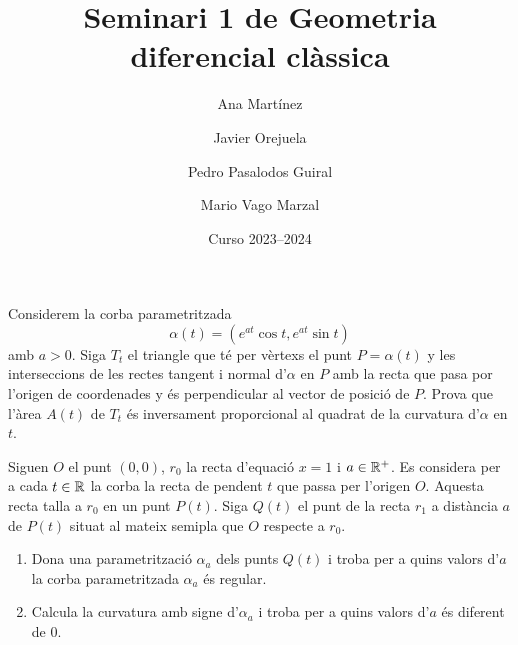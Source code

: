 \documentclass[a4paper, 11pt]{article}
\title{Seminari 1 de Geometria diferencial clàssica}
\author{Ana Martínez \and Javier Orejuela \and%
  Pedro Pasalodos Guiral \and Mario Vago Marzal}
\date{Curso 2023--2024}
\begin{document}
  \maketitle

  \begin{exercise}
    Considerem la corba parametritzada
    \[
      \alpha(t) = (e^{at} \cos t, e^{at} \sin t)
    \]
    amb $a > 0$. Siga $T_t$ el triangle que té per vèrtexs el punt $P =
    \alpha(t)$ y les interseccions de les rectes tangent i normal
    d'$\alpha$ en $P$ amb la recta que pasa por l'origen de coordenades y
    és perpendicular al vector de posició de $P$. Prova que l'àrea $A(t)$
    de $T_t$ és inversament proporcional al quadrat de la curvatura
    d'$\alpha$ en $t$.
  \end{exercise}

  \begin{solution}
    
  \end{solution}

  \begin{exercise}
    Siguen $O$ el punt $(0, 0)$, $r_0$ la recta d'equació $x=1$ i $a \in
    \mathbb{R}^+$. Es considera per a cada $t \in \mathbb{R}$ la corba la recta de
    pendent $t$ que passa per l'origen $O$. Aquesta recta talla a $r_0$ en
    un punt $P(t)$. Siga $Q(t)$ el punt de la recta $r_1$ a distància $a$
    de $P(t)$ situat al mateix semipla que $O$ respecte a $r_0$.

    \begin{enumerate}[label=(\alph*)]
      \item Dona una parametrització $\alpha_a$ dels punts $Q(t)$ i troba
      per a quins valors d'$a$ la corba parametritzada $\alpha_a$ és
      regular.
      \item Calcula la curvatura amb signe d'$\alpha_a$ i troba per a quins
      valors d'$a$ és diferent de $0$.
    \end{enumerate}
  \end{exercise}
\end{document}
